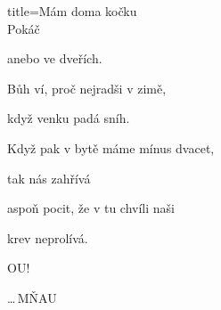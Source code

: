 \begin{song}{title=\predtitle\centering Mám doma kočku\\\large Pokáč \vspace*{-0.3cm}}
{\begin{varwidth}[t]{0.5\textwidth}
   anebo ve dveřích.
   
   Bůh ví, proč nejradši v zimě,
   
   když venku padá sníh.
   
   
\sloka
   Když pak v bytě máme mínus dvacet,
   
   tak nás zahřívá
   
   aspoň pocit, že v tu chvíli naši
   
   krev neprolívá.
   
   OU!
   
   
\elipsa\ldots\,MŇAU
   
\end{varwidth}   
}
\setcounter{Slokočet}{0}
\end{song}
